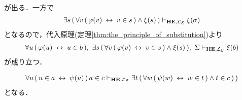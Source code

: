 \begin{metaprf}
\begin{description}
\begin{description}
\begin{align}
						\end{align}
						が出る．一方で
						\begin{align}
							\exists s\, (\, \forall v\, (\, \varphi(v) \lrarrow v \in s\, ) \wedge \xi(s)\, )
							\provable{\mbox{{\bf HE}},\lang{\varepsilon}} \xi(\sigma)
						\end{align}
						となるので，代入原理(定理\ref{thm:the_principle_of_substitution})より
						\begin{align}
							\forall u\, (\, \varphi(u) \lrarrow u \in b\, ),\ 
							\exists s\, (\, \forall v\, (\, \varphi(v) \lrarrow v \in s\, ) \wedge \xi(s)\, ),\ 
							\Sigma
							\provable{\mbox{{\bf HE}},\lang{\varepsilon}} \xi(b)
						\end{align}
						が成り立つ．
						
						
						\begin{align}
							\forall u\, (\, u \in a \lrarrow \psi(u)\, )\, a \in c
							\provable{\mbox{{\bf HE}},\lang{\varepsilon}} \exists t\, (\, \forall w\, (\, \psi(w) \lrarrow w \in t\, ) \wedge t \in c\, )\, )
						\end{align}
						となる．
						

\end{description}
\end{description}
\end{metaprf}
